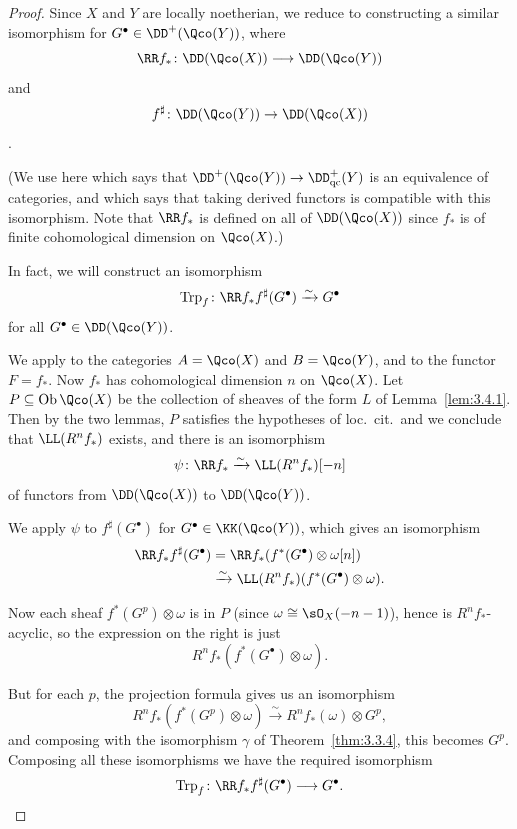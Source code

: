 \begin{proof}
Since $X$ and $Y$ are locally noetherian, we reduce to constructing a similar isomorphism for $G^\bullet\in\DD^+(\Qco(Y))$, where
\[
\RR f_*\colon \DD(\Qco(X)) \longrightarrow \DD(\Qco(Y))
\]
and \[f^{\sharp}\colon \DD(\Qco(Y))\to\DD(\Qco(X))\].

(We use here  which says that $\DD^+(\Qco(Y))\to\DD_{\mathrm{qc}}^+(Y)$ is an equivalence of categories, and  which says that taking derived functors is compatible with this isomorphism. Note that $\RR f_*$ is defined on all of $\DD(\Qco(X))$ since $f_*$ is of finite cohomological dimension on $\Qco(X)$.)

In fact, we will construct an isomorphism
\[
\operatorname{Trp}_f\colon \RR f_* f^{\sharp}(G^\bullet) \xrightarrow{\sim} G^\bullet
\]
for all $G^\bullet\in\DD(\Qco(Y))$.

We apply  to the categories $A=\Qco(X)$ and $B=\Qco(Y)$, and to the functor $F=f_*$. Now $f_*$ has cohomological dimension $n$ on $\Qco(X)$. Let $P\subseteq\operatorname{Ob}\Qco(X)$ be the collection of sheaves of the form $L$ of Lemma~\ref{lem:3.4.1}. Then by the two lemmas, $P$ satisfies the hypotheses of loc.\ cit.\ and we conclude that $\LL(R^n f_*)$ exists, and there is an isomorphism
\[
\psi\colon \RR f_* \xrightarrow{\sim} \LL(R^n f_*)[-n]
\]
of functors from $\DD(\Qco(X))$ to $\DD(\Qco(Y))$.

We apply $\psi$ to $f^{\sharp}(G^\bullet)$ for $G^\bullet\in\KK(\Qco(Y))$, which gives an isomorphism
\begin{align*}
\RR f_* f^{\sharp}(G^\bullet) &= \RR f_* (f^*(G^\bullet)\otimes\omega[n]) \\
&\xrightarrow{\sim} \LL(R^n f_*)(f^*(G^\bullet)\otimes\omega).
\end{align*}

Now each sheaf $f^*(G^p)\otimes\omega$ is in $P$ (since $\omega\cong\sO_X(-n-1)$), hence is $R^n f_*$-acyclic, so the expression on the right is just
\[
R^n f_*(f^*(G^\bullet)\otimes\omega).
\]

But for each $p$, the projection formula gives us an isomorphism
\[
R^n f_*(f^*(G^p)\otimes\omega) \xrightarrow{\sim} R^n f_*(\omega)\otimes G^p,
\]
and composing with the isomorphism $\gamma$ of Theorem~\ref{thm:3.3.4}, this becomes $G^p$. Composing all these isomorphisms we have the required isomorphism
\[
\operatorname{Trp}_f \colon \RR f_* f^{\sharp}(G^\bullet) \longrightarrow G^\bullet.
\]
\end{proof}

